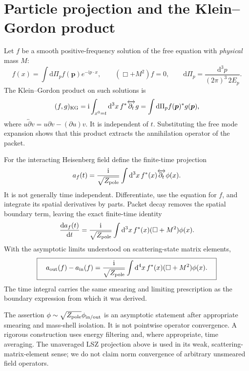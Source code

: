 \documentclass[11pt]{article}
\newcommand{\dd}{\mathrm d}
\newcommand{\ii}{\mathrm i}
\newcommand{\module}[1]{\clearpage\section{#1}}
\newcommand{\dPi}{\dd\Pi}
\newcommand{\Zp}{Z_{\rm pole}}
\begin{document}
\module{Particle projection and the Klein--Gordon product}
Let \(f\) be a smooth positive-frequency solution of the free equation with
\emph{physical} mass \(M\):
\begin{equation}
 f(x)=\int\dPi_p f(\bm p)e^{-\ii p\cdot x},\qquad
 (\Box+M^2)f=0,\qquad
 \dPi_p=\frac{\dd^3p}{(2\pi)^3\,2E_p}.
\end{equation}
The Klein--Gordon product on such solutions is
\begin{equation}
 (f,g)_{\rm KG}=\ii\int_{x^0=t}\dd^3x\,
 f^*\overleftrightarrow{\partial_t}g
 =\int\dPi_p f(\bm p)^*g(\bm p),
 \label{eq:KGproduct}
\end{equation}
where \(u\overleftrightarrow\partial v=u\partial v-(\partial u)v\).
It is independent of \(t\). Substituting the free mode expansion shows
that this product extracts the annihilation operator of the packet.

For the interacting Heisenberg field define the finite-time projection
\begin{equation}
 a_f(t)=\frac{\ii}{\sqrt{\Zp}}\int\dd^3x\,
 f^*(x)\overleftrightarrow{\partial_t}\phi(x).
 \label{eq:projection}
\end{equation}
It is not generally time independent. Differentiate, use the equation
for \(f\), and integrate its spatial derivatives by parts. Packet decay
removes the spatial boundary term, leaving the exact finite-time identity
\begin{equation}
 \frac{\dd a_f(t)}{\dd t}
 =\frac{\ii}{\sqrt{\Zp}}\int\dd^3x\,f^*(x)(\Box+M^2)\phi(x).
\end{equation}
With the asymptotic limits understood on scattering-state matrix elements,
\begin{equation}
 \boxed{\quad a_{\rm out}(f)-a_{\rm in}(f)
 =\frac{\ii}{\sqrt{\Zp}}\int\dd^4x\,
 f^*(x)(\Box+M^2)\phi(x).\quad}
 \label{eq:adifference}
\end{equation}
The time integral carries the same smearing and limiting prescription as
the boundary expression from which it was derived.

\begin{remarkbox}
The assertion \(\phi\sim\sqrt{\Zp}\phi_{\rm in/out}\) is an asymptotic
statement after appropriate smearing and mass-shell isolation. It is not
pointwise operator convergence. A rigorous construction uses energy
filtering and, where appropriate, time averaging. The unaveraged LSZ
projection above is used in its weak, scattering-matrix-element sense;
we do not claim norm convergence of arbitrary unsmeared field operators.
\end{remarkbox}
\end{document}
